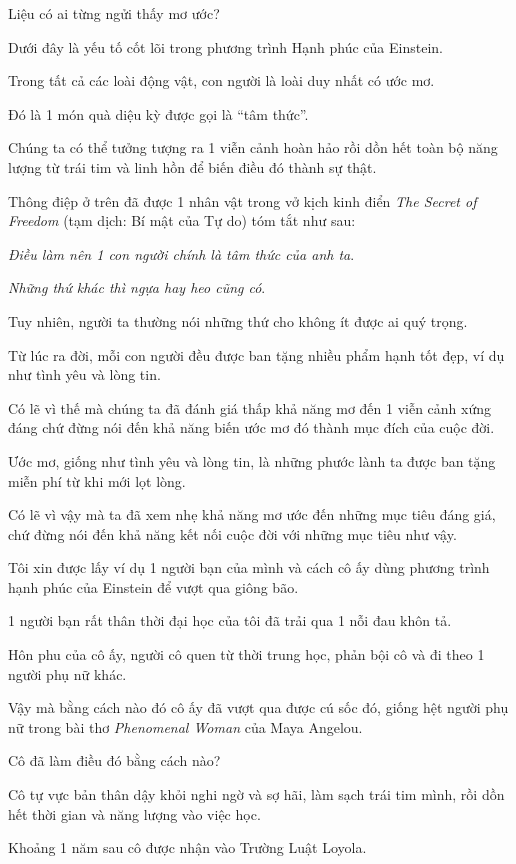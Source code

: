 \documentclass{book}
\numberwithin{equation}{section}
\begin{document}
Liệu có ai từng ngửi thấy mơ ước?

Dưới đây là yếu tố cốt lõi trong phương trình Hạnh phúc của Einstein.

%
Trong tất cả các loài động vật, con người là loài duy nhất có ước mơ.

Đó là 1 món quà diệu kỳ được gọi là ``tâm thức''.

Chúng ta có thể tưởng tượng ra 1 viễn cảnh hoàn hảo rồi dồn hết toàn bộ năng lượng từ trái tim và linh hồn để biến điều đó thành sự thật.

%
Thông điệp ở trên đã được 1 nhân vật trong vở kịch kinh điển \textit{The Secret of Freedom} (tạm dịch: Bí mật của Tự do) tóm tắt như sau:

%
\textit{Điều làm nên 1 con người chính là tâm thức của anh ta}.

\textit{Những thứ khác thì ngựa hay heo cũng có}.

%
Tuy nhiên, người ta thường nói những thứ cho không ít được ai quý trọng.

%
Từ lúc ra đời, mỗi con người đều được ban tặng nhiều phẩm hạnh tốt đẹp, ví dụ như tình yêu và lòng tin.

Có lẽ vì thế mà chúng ta đã đánh giá thấp khả năng mơ đến 1 viễn cảnh xứng đáng chứ đừng nói đến khả năng biến ước mơ đó thành mục đích của cuộc đời.

Ước mơ, giống như tình yêu và lòng tin, là những phước lành ta được ban tặng miễn phí từ khi mới lọt lòng.

Có lẽ vì vậy mà ta đã xem nhẹ khả năng mơ ước đến những mục tiêu đáng giá, chứ đừng nói đến khả năng kết nối cuộc đời với những mục tiêu như vậy.

%
Tôi xin được lấy ví dụ 1 người bạn của mình và cách cô ấy dùng phương trình hạnh phúc của Einstein để vượt qua giông bão.

%
1 người bạn rất thân thời đại học của tôi đã trải qua 1 nỗi đau khôn tả.

Hôn phu của cô ấy, người cô quen từ thời trung học, phản bội cô và đi theo 1 người phụ nữ khác.

Vậy mà bằng cách nào đó cô ấy đã vượt qua được cú sốc đó, giống hệt người phụ nữ trong bài thơ \textit{Phenomenal Woman} của Maya Angelou.

%
Cô đã làm điều đó bằng cách nào?

%
Cô tự vực bản thân dậy khỏi nghi ngờ và sợ hãi, làm sạch trái tim  mình, rồi dồn hết thời gian và năng lượng vào việc học.

Khoảng 1 năm sau cô được nhận vào Trường Luật Loyola.
\end{document}
